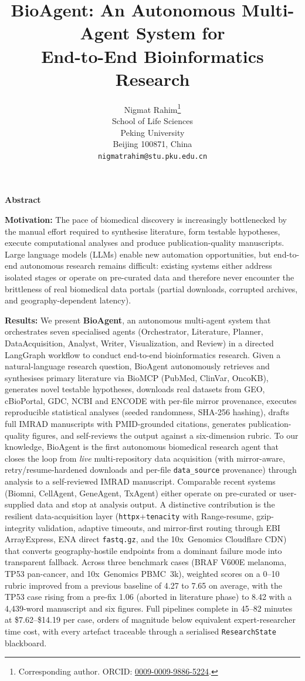 \documentclass[11pt]{article}
\title{BioAgent: An Autonomous Multi-Agent System for\\
  End-to-End Bioinformatics Research}
\author{%
  Nigmat Rahim\thanks{Corresponding author.
    ORCID: \href{https://orcid.org/0009-0009-9886-5224}{0009-0009-9886-5224}.} \\
  School of Life Sciences \\
  Peking University \\
  Beijing 100871, China \\
  \texttt{nigmatrahim@stu.pku.edu.cn} \\
}
\date{}
\renewenvironment{abstract}{%
  \begin{center}{\bfseries\large Abstract}\end{center}
  \begin{list}{}{%
    \setlength{\leftmargin}{0.4in}%
    \setlength{\rightmargin}{0.4in}}\item\relax\small
}{%
  \end{list}\vspace{0.5ex}%
}
\begin{document}
\maketitle

\begin{abstract}
\textbf{Motivation:}
The pace of biomedical discovery is increasingly bottlenecked by the manual
effort required to synthesise literature, form testable hypotheses, execute
computational analyses and produce publication-quality manuscripts.
Large language models (LLMs) enable new automation opportunities, but
end-to-end autonomous research remains difficult: existing systems either
address isolated stages or operate on pre-curated data and therefore never
encounter the brittleness of real biomedical data portals (partial
downloads, corrupted archives, and geography-dependent latency).

\textbf{Results:}
We present \textbf{BioAgent}, an autonomous multi-agent system that
orchestrates seven specialised agents (Orchestrator, Literature, Planner,
DataAcquisition, Analyst, Writer, Visualization, and Review) in a directed
LangGraph workflow to conduct end-to-end bioinformatics research.
Given a natural-language research question, BioAgent autonomously retrieves
and synthesises primary literature via BioMCP (PubMed, ClinVar, OncoKB),
generates novel testable hypotheses, downloads real datasets from GEO,
cBioPortal, GDC, NCBI and ENCODE with per-file mirror provenance, executes
reproducible statistical analyses (seeded randomness, SHA-256 hashing),
drafts full IMRAD manuscripts with PMID-grounded citations, generates
publication-quality figures, and self-reviews the output against a
six-dimension rubric.
To our knowledge, BioAgent is the first autonomous biomedical research
agent that closes the loop from \emph{live} multi-repository data
acquisition (with mirror-aware, retry/resume-hardened downloads and
per-file \texttt{data\_source} provenance) through analysis to a
self-reviewed IMRAD manuscript.
Comparable recent systems (Biomni, CellAgent, GeneAgent, TxAgent)
either operate on pre-curated or user-supplied data and stop at
analysis output.
A distinctive contribution is the resilient data-acquisition layer
(\texttt{httpx}+\texttt{tenacity} with Range-resume, gzip-integrity
validation, adaptive timeouts, and mirror-first routing through EBI
ArrayExpress, ENA direct \texttt{fastq.gz}, and the 10x~Genomics
Cloudflare CDN) that converts geography-hostile endpoints from a dominant
failure mode into transparent fallback.
Across three benchmark cases (BRAF V600E melanoma, TP53 pan-cancer, and
10x~Genomics PBMC~3k), weighted scores on a 0--10 rubric improved from
a previous baseline of 4.27 to 7.65 on average, with the TP53 case rising
from a pre-fix 1.06 (aborted in literature phase) to 8.42 with a
4{,}439-word manuscript and six figures.
Full pipelines complete in 45--82 minutes at \$7.62--\$14.19 per case,
orders of magnitude below equivalent expert-researcher time cost, with
every artefact traceable through a serialised \texttt{ResearchState}
blackboard.


\end{abstract}
\end{document}
